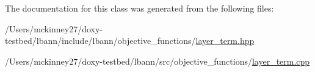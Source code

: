The documentation for this class was generated from the following files\+:\begin{DoxyCompactItemize}
\item 
/\+Users/mckinney27/doxy-\/testbed/lbann/include/lbann/objective\+\_\+functions/\hyperlink{layer__term_8hpp}{layer\+\_\+term.\+hpp}\item 
/\+Users/mckinney27/doxy-\/testbed/lbann/src/objective\+\_\+functions/\hyperlink{layer__term_8cpp}{layer\+\_\+term.\+cpp}\end{DoxyCompactItemize}
